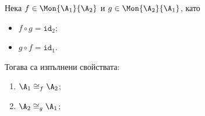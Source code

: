 \begin{proposition}
  \label{pr:isomorphic-pair}
  Нека $f \in \Mon{\A_1}{\A_2}$ и $g \in \Mon{\A_2}{\A_1}$,
  като 
  \begin{itemize}
  \item 
    $f \circ g = \texttt{id}_2$;
  \item
    $g \circ f = \texttt{id}_1$.
  \end{itemize}
  Тогава са изпълнени свойствата:
  \begin{enumerate}[(1)]
  \item
    $\A_1 \cong_f \A_2$;
  \item
    $\A_2 \cong_g \A_1$;
  \end{enumerate}
\end{proposition}


